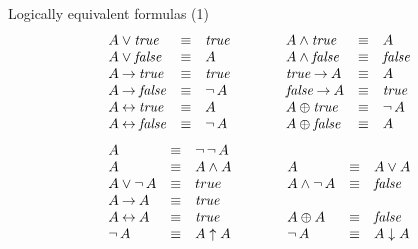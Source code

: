 \documentclass[style=simple,size=12pt]{powerdot}
\begin{document}
\begin{wideslide}[bm=,toc=]{Logically equivalent formulas (1)}
\vspace*{-2ex}
\begin{displaymath}
\begin{array}{lcl@{\hspace{4em}}lcl}
A \vee  \mathit{true} &\logeqv& \mathit{true} &
  A \wedge \mathit{true} &\logeqv& A \\
A \vee \mathit{false} &\logeqv& A &
  A \wedge \mathit{false} &\logeqv&\mathit{false}\\
A \imp \mathit{true} &\logeqv& \mathit{true} &
  \mathit{true} \imp A &\logeqv& A \\
A\imp \mathit{false} &\logeqv& \ngg A &
  \mathit{false} \imp A &\logeqv& \mathit{true}\\
A\eqv \mathit{true} &\logeqv& A &
A \neqv  \mathit{true}&\logeqv&\ngg A\\
A\eqv \mathit{false} &\logeqv& \ngg A &
A \neqv  \mathit{false}&\logeqv& A\\
\end{array}
\end{displaymath}
\vspace*{-1ex}
\begin{displaymath}
\begin{array}{lcl@{\hspace{4em}}lcl}
A &\logeqv& \ngg \ngg A & \\
A &\logeqv& A \wedge A & A &\logeqv& A \vee A \\
A \vee \ngg A &\logeqv& true &
  A \wedge \ngg A &\logeqv& \mathit{false} \\
A \imp A &\logeqv&  \mathit{true}& \\
A \eqv A &\logeqv&  \mathit{true} &
A \neqv A   &\logeqv& \mathit{false} \\
\ngg A &\logeqv& A \uparrow A &
  \ngg A &\logeqv& A \downarrow A\\
\end{array}
\end{displaymath}
\end{wideslide}
\end{document}
